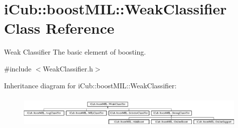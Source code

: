 \section{i\+Cub\+:\+:boost\+M\+I\+L\+:\+:Weak\+Classifier Class Reference}
\label{classiCub_1_1boostMIL_1_1WeakClassifier}


Weak Classifier The basic element of boosting.  




{\ttfamily \#include $<$Weak\+Classifier.\+h$>$}

Inheritance diagram for i\+Cub\+:\+:boost\+M\+I\+L\+:\+:Weak\+Classifier\+:\begin{figure}[H]
\begin{center}
\leavevmode
\includegraphics[height=1.607656cm]{classiCub_1_1boostMIL_1_1WeakClassifier}
\end{center}
\end{figure}
